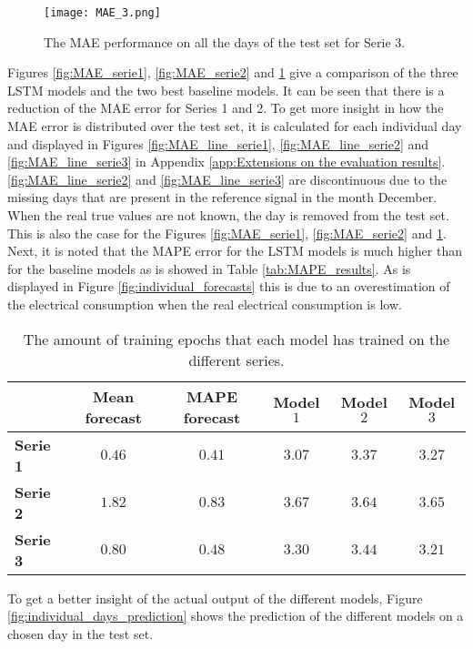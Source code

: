 \begin{figure}[h]
	\centering
	\texttt{[image: MAE\_3.png]}
	\caption{The MAE performance on all the days of the test set for Serie 3.}
	\label{fig:MAE_serie3}
\end{figure}	

Figures \ref{fig:MAE_serie1}, \ref{fig:MAE_serie2} and \ref{fig:MAE_serie3} give a comparison of the three LSTM models and the two best baseline models. It can be seen that there is a reduction of the MAE error for Series 1 and 2. To get more insight in how the MAE error is distributed over the test set, it is calculated for each individual day and displayed in Figures \ref{fig:MAE_line_serie1}, \ref{fig:MAE_line_serie2} and \ref{fig:MAE_line_serie3} in Appendix \ref{app:Extensions on the evaluation results}. \ref{fig:MAE_line_serie2} and \ref{fig:MAE_line_serie3} are discontinuous due to the missing days that are present in the reference signal in the month December. When the real true values are not known, the day is removed from the test set. This is also the case for the Figures \ref{fig:MAE_serie1}, \ref{fig:MAE_serie2} and \ref{fig:MAE_serie3}. \\
Next, it is noted that the MAPE error for the LSTM models is much higher than for the baseline models as is showed in Table \ref{tab:MAPE_results}. As is displayed in Figure \ref{fig:individual_forecasts} this is due to an overestimation of the electrical consumption when the real electrical consumption is low.\\

\begin{table}[h]
	\centering
	\begin{tabular}{@{}l|ccccc@{}} \toprule
		&\textbf{Mean forecast} & \textbf{MAPE forecast} & \textbf{Model $ 1 $} & \textbf{Model $ 2 $} & \textbf{Model $ 3 $}\\\midrule
		\textbf{Serie 1} & $0.46 $&$ 0.41$  & $3.07 $ & $3.37 $  & $3.27 $\\
		\textbf{Serie 2} & $1.82 $&$ 0.83 $  & $3.67$ & $3.64 $  & $3.65 $\\
		\textbf{Serie 3} & $0.80 $&$ 0.48 $  & $3.30$ & $3.44 $ & $3.21 $\\\bottomrule
	\end{tabular}
	\caption{The amount of training epochs that each model has trained on the different series.}
	\label{tab:summary_MAPE_error}
\end{table}

To get a better insight of the actual output of the different models, Figure \ref{fig:individual_days_prediction} shows the prediction of the different models on a chosen day in the test set.
 

